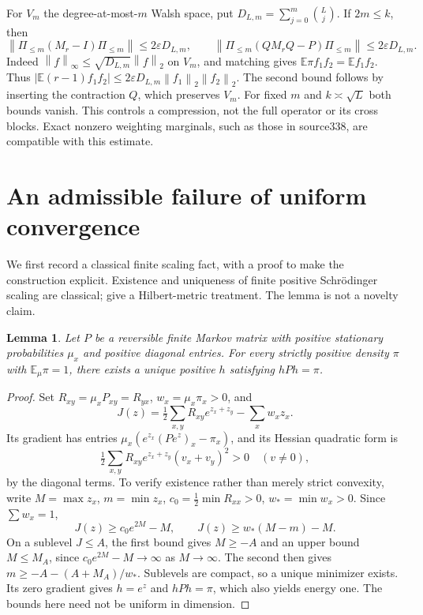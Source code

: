 \documentclass[11pt]{article}
\newtheorem{lemma}[theorem]{Lemma}
\newcommand{\E}{\mathbb E}
\newcommand{\norm}[1]{\left\|#1\right\|}
\begin{document}
For $V_m$ the degree-at-most-$m$ Walsh space, put $D_{L,m}=\sum_{j=0}^m\binom Lj$. If $2m\leq k$, then
\begin{equation}\label{compression}
 \norm{\Pi_{\leq m}(M_r-I)\Pi_{\leq m}}
 \leq2\varepsilon D_{L,m},\qquad
 \norm{\Pi_{\leq m}(QM_rQ-P)\Pi_{\leq m}}
 \leq2\varepsilon D_{L,m}.
\end{equation}
Indeed $\norm f_\infty\leq\sqrt{D_{L,m}}\norm f_2$ on $V_m$, and matching gives $\E\pi f_1f_2=\E f_1f_2$. Thus $|\E(r-1)f_1f_2|\leq2\varepsilon D_{L,m}\norm{f_1}_2\norm{f_2}_2$. The second bound follows by inserting the contraction $Q$, which preserves $V_m$. For fixed $m$ and $k\asymp\sqrt L$ both bounds vanish. This controls a compression, not the full operator or its cross blocks. Exact nonzero weighting marginals, such as those in source338, are compatible with this estimate.

\section{An admissible failure of uniform convergence}
We first record a classical finite scaling fact, with a proof to make the construction explicit. Existence and uniqueness of finite positive Schr\"odinger scaling are classical; \cite[Theorem3 and Lemma1]{gp} give a Hilbert-metric treatment. The lemma is not a novelty claim.
\begin{lemma}\label{scaling}
Let $P$ be a reversible finite Markov matrix with positive stationary probabilities $\mu_x$ and positive diagonal entries. For every strictly positive density $\pi$ with $\E_\mu\pi=1$, there exists a unique positive $h$ satisfying $hPh=\pi$.
\end{lemma}
\begin{proof}
Set $R_{xy}=\mu_xP_{xy}=R_{yx}$, $w_x=\mu_x\pi_x>0$, and
\[
 J(z)=\tfrac12\sum_{x,y}R_{xy}e^{z_x+z_y}-\sum_xw_xz_x.
\]
Its gradient has entries $\mu_x(e^{z_x}(Pe^z)_x-\pi_x)$, and its Hessian quadratic form is
\[
 \tfrac12\sum_{x,y}R_{xy}e^{z_x+z_y}(v_x+v_y)^2>0\quad(v\ne0),
\]
by the diagonal terms. To verify existence rather than merely strict convexity, write $M=\max z_x$, $m=\min z_x$, $c_0=\tfrac12\min R_{xx}>0$, $w_* =\min w_x>0$. Since $\sum w_x=1$,
\[
 J(z)\geq c_0e^{2M}-M,\qquad J(z)\geq w_*(M-m)-M.
\]
On a sublevel $J\leq A$, the first bound gives $M\geq-A$ and an upper bound $M\leq M_A$, since $c_0e^{2M}-M\to\infty$ as $M\to\infty$. The second then gives $m\geq-A-(A+M_A)/w_*$. Sublevels are compact, so a unique minimizer exists. Its zero gradient gives $h=e^z$ and $hPh=\pi$, which also yields energy one. The bounds here need not be uniform in dimension.
\end{proof}
\end{document}
